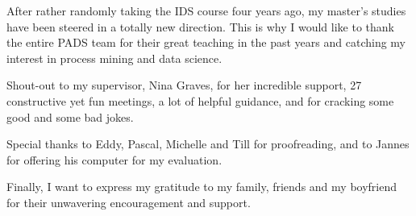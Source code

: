 
After rather randomly taking the IDS course four years ago,
my master's studies have been steered in a totally new direction.
This is why I would like to thank the entire PADS team
for their great teaching in the past years and catching my interest in process mining and data science.

Shout-out to my supervisor, Nina Graves, for her incredible support,
27 constructive yet fun meetings, a lot of helpful guidance, and for cracking some good and some bad jokes.

Special thanks to Eddy, Pascal, Michelle and Till for proofreading,
and to Jannes for offering his computer for my evaluation.

Finally, I want to express my gratitude to my family, friends and my boyfriend for their unwavering encouragement and support.
